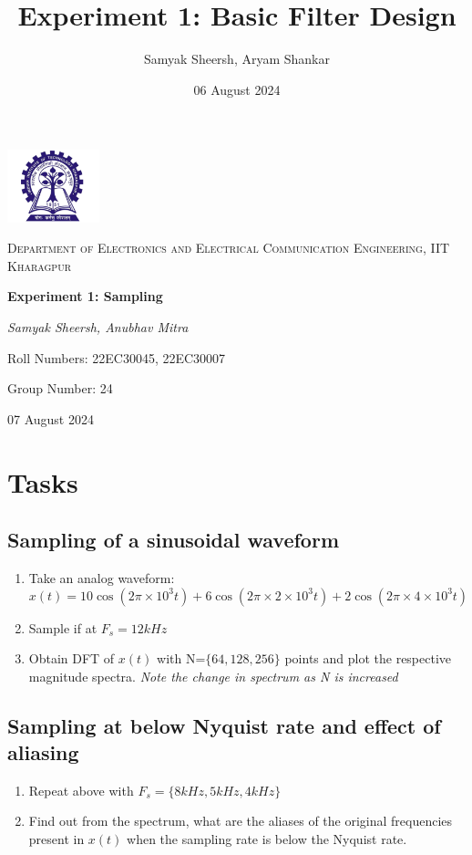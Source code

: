 \documentclass{article}
\title{Experiment 1: Basic Filter Design}
\author{Samyak Sheersh, Aryam Shankar}
\date{06 August 2024}
\begin{document}
\begin{titlepage}
    \centering
    \includegraphics[width=0.2\textwidth]{KGP_logo.png}\par\vspace{1cm}
    {\scshape\LARGE Department of Electronics and Electrical Communication Engineering, IIT Kharagpur\par}
    \vspace{1cm}
    {\huge\bfseries Experiment 1: Sampling\par}
    \vspace{1.5cm}
    {\Large\itshape Samyak Sheersh, Anubhav Mitra\par}
    \vfill
    {\large Roll Numbers: 22EC30045, 22EC30007\par}
    {\large Group Number: 24\par}
    \vfill
    {\large 07 August 2024\par}
\end{titlepage}

\section{Tasks}
\subsection{Sampling of a sinusoidal waveform}
\begin{enumerate}
  \item Take an analog waveform:
    $$
    x(t)=10\cos(2\pi\times 10^3t)+6\cos(2\pi\times2\times10^3t)+2\cos(2\pi\times4\times10^3t)
    $$
  \item Sample if at $F_s=12kHz$
  \item Obtain DFT of $x(t)$ with N=$\{64,128,256\}$ points and plot the respective magnitude spectra.
  \emph{Note the change in spectrum as N is increased}
\end{enumerate}

\subsection{Sampling at below Nyquist rate and effect of aliasing}
\begin{enumerate}
  \item Repeat above with $F_s= \{8kHz, 5kHz, 4kHz\}$
  \item Find out from the spectrum, what are the aliases of the original frequencies present in $x(t)$ when the sampling rate is below the Nyquist rate.
\end{enumerate}
\end{document}
